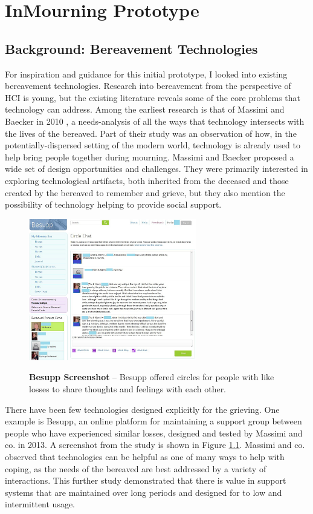 \chapter{InMourning Prototype}

\section{Background: Bereavement Technologies}
  For inspiration and guidance for this initial prototype,
  I looked into existing bereavement technologies.
  Research into bereavement from the perspective of HCI is young, but the
  existing literature reveals some of the core problems that technology can
  address. Among the earliest research is that of Massimi and Baecker in 2010
  \cite{mm10},
  a needs-analysis of all the ways that technology intersects with the lives of
  the bereaved.
  Part of their study was an observation of how,
  in the potentially-dispersed setting of the modern world, 
  technology is already used to help bring people together during mourning.
  Massimi and Baecker proposed a wide set of design opportunities and challenges.
  They were primarily interested in exploring technological artifacts,
  both inherited from the deceased and those created by the bereaved to
  remember and grieve, but they also mention the possibility of technology
  helping to provide social support.

  \begin{figure}
  \caption{\textbf{Besupp Screenshot} --
  Besupp offered circles for people with like losses to share thoughts
  and feelings with each other.
  }
  \centering
  \includegraphics[width=0.65\textwidth]{besupp.png}
  \label{fig:besupp}
  \end{figure}

  There have been few technologies designed explicitly for the grieving. One
  example is Besupp, an online platform for maintaining a support group between
  people who have experienced similar losses, designed and tested by Massimi and
  co. in 2013. \cite{mm13}
  A screenshot from the study is shown in Figure \ref{fig:besupp}.
  Massimi and co. observed that technologies can be helpful as
  one of many ways to help with coping, as the needs of the bereaved are best
  addressed by a variety of interactions.
  This further study demonstrated that
  there is value in support systems that are maintained over long periods and
  designed for to low and intermittent usage.


